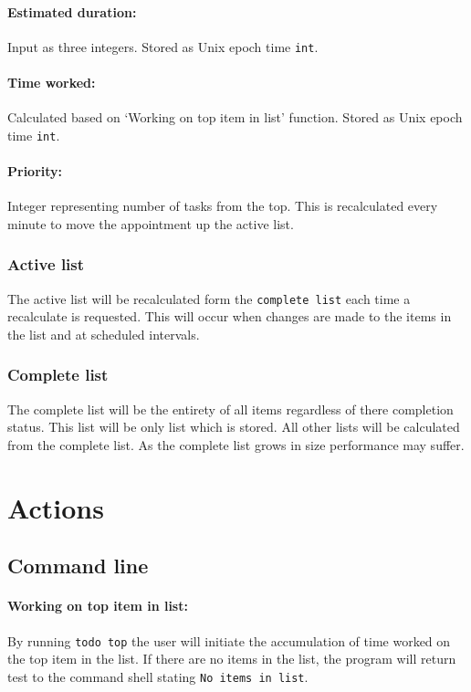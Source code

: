 \documentclass[12pt]{article}
\newcommand{\e}[1] {{\tt #1}}
\begin{document}
\paragraph{Estimated duration:} Input as three integers. Stored as Unix epoch time \e{int}.
\paragraph{Time worked:} Calculated based on `Working on top item in list' function. Stored as Unix epoch time \e{int}. 
\paragraph{Priority:} Integer representing number of tasks from the top. This is recalculated every minute to move the appointment up the active list.

\subsubsection{Active list} \label{sec:Active list}
The active list will be recalculated form the \e{complete list} each time a recalculate is requested.  This will occur when changes are made to the items in the list and at scheduled intervals.

\subsubsection{Complete list} \label{sec:Complete list}
The complete list will be the entirety of all items regardless of there completion status. This list will be only list which is stored. All other lists will be calculated from the complete list.  As the complete list grows in size performance may suffer. 

\section{Actions}
\subsection{Command line}
\setcounter{paragraph}{0}
\setcounter{subsubsection}{0}
\paragraph{Working on top item in list:} \label{sec:Working on top} By running \e{todo top} the user will initiate the accumulation of time worked on the top item in the list. If there are no items in the list, the program will return test to the command shell stating \e{No items in list}.
\end{document}

